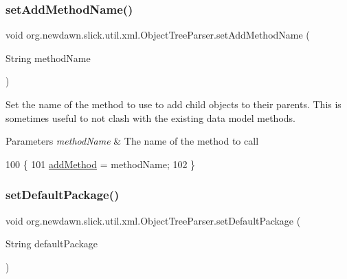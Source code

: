 \subsubsection{\texorpdfstring{set\+Add\+Method\+Name()}{setAddMethodName()}}
{\footnotesize\ttfamily void org.\+newdawn.\+slick.\+util.\+xml.\+Object\+Tree\+Parser.\+set\+Add\+Method\+Name (\begin{DoxyParamCaption}\item[{String}]{method\+Name }\end{DoxyParamCaption})\hspace{0.3cm}{\ttfamily [inline]}}

Set the name of the method to use to add child objects to their parents. This is sometimes useful to not clash with the existing data model methods.


\begin{DoxyParams}{Parameters}
{\em method\+Name} & The name of the method to call \\
\hline
\end{DoxyParams}

\begin{DoxyCode}
100                                                     \{
101         \mbox{\hyperlink{classorg_1_1newdawn_1_1slick_1_1util_1_1xml_1_1_object_tree_parser_a063295dc4b123cde10949867045f71e6}{addMethod}} = methodName;
102     \}
\end{DoxyCode}
\mbox{\label{classorg_1_1newdawn_1_1slick_1_1util_1_1xml_1_1_object_tree_parser_a3257fc35ecae8f9c27bbdc9cd2b489b2}} 
\subsubsection{\texorpdfstring{set\+Default\+Package()}{setDefaultPackage()}}
{\footnotesize\ttfamily void org.\+newdawn.\+slick.\+util.\+xml.\+Object\+Tree\+Parser.\+set\+Default\+Package (\begin{DoxyParamCaption}\item[{String}]{default\+Package }\end{DoxyParamCaption})\hspace{0.3cm}{\ttfamily [inline]}}

